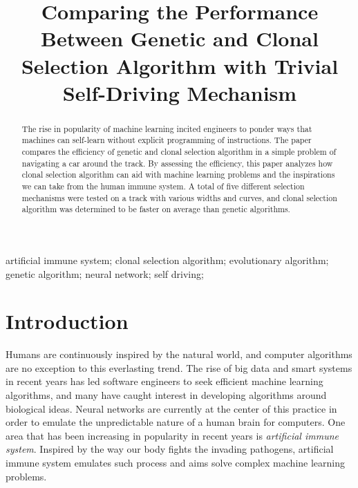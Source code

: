 \documentclass[]{interact}
\theoremstyle{plain} %
\theoremstyle{definition}
\theoremstyle{remark}
\begin{document}
\articletype{} %

\title{Comparing the Performance Between Genetic and Clonal Selection Algorithm with Trivial Self-Driving Mechanism}

\author{
}

\maketitle

\begin{abstract}
The rise in popularity of machine learning incited engineers to ponder ways that machines can self-learn without explicit programming of instructions. The paper compares the efficiency of genetic and clonal selection algorithm in a simple problem of navigating a car around the track. By assessing the efficiency, this paper analyzes how clonal selection algorithm can aid with machine learning problems and the inspirations we can take from the human immune system. A total of five different selection mechanisms were tested on a track with various widths and curves, and clonal selection algorithm was determined to be faster on average than genetic algorithms.
\end{abstract}

\begin{keywords}
artificial immune system; clonal selection algorithm; evolutionary algorithm; genetic algorithm; neural network; self driving;
\end{keywords}

\section{Introduction}

Humans are continuously inspired by the natural world, and computer algorithms are no exception to this everlasting trend. The rise of big data and smart systems in recent years has led software engineers to seek efficient machine learning algorithms, and many have caught interest in developing algorithms around biological ideas. Neural networks are currently at the center of this practice in order to emulate the unpredictable nature of a human brain for computers. One area that has been increasing in popularity in recent years is \textit{artificial immune system}. Inspired by the way our body fights the invading pathogens, artificial immune system emulates such process and aims solve complex machine learning problems.
\end{document}
